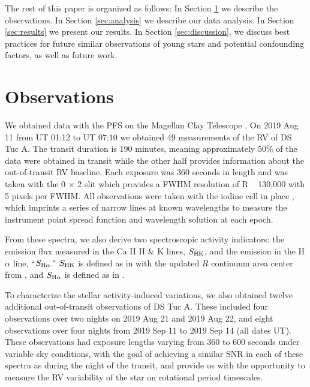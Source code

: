 \documentclass[twocolumn]{aastex63}
\begin{document}
The rest of this paper is organized as follows:
In Section \ref{sec:obs} we describe the observations.
In Section \ref{sec:analysis} we describe our data analysis.
In Section \ref{sec:results} we present our results.
In Section \ref{sec:discussion}, we discuss best practices for future similar observations of young stars and potential confounding factors, as well as future work.


\section{Observations}
\label{sec:obs}

We obtained data with the PFS on the Magellan Clay Telescope \citep{Crane06, Crane08, Crane10}. 
On 2019 Aug 11 from UT 01:12 to UT 07:10 we obtained 49 measurements of the RV of DS Tuc A. 
The transit duration is 190 minutes, meaning approximately 50\% of the data were obtained in transit while the other half provides information about the out-of-transit RV baseline. Each exposure was 360 seconds in length and was taken with the 0 $\times$ 2 slit which provides a FWHM resolution of R ~ 130,000 with 5 pixels per FWHM. All observations were taken with the iodine cell in place \citep{Marcy92}, which imprints a series of narrow lines at known wavelengths to measure the instrument point spread function and wavelength solution at each epoch.

From these spectra, we also derive two spectroscopic activity indicators: the emission flux measured in the Ca \textsc{II} H \& K lines, $S_{\rm HK}$, and the emission in the H$\alpha$ line, ``$S_{\rm H\alpha}$.'' $S_{\rm HK}$ is defined as in \cite{duncan1991} with the updated $R$ continuum area center from \cite{santos2000}, and $S_{\rm H\alpha}$ is defined as in \cite{gomesdasilva2011}.

To characterize the stellar activity-induced variations, we also obtained twelve additional out-of-transit observations of DS Tuc A. These included four observations over two nights on 2019 Aug 21 and 2019 Aug 22, and eight observations over four nights from 2019 Sep 11 to 2019 Sep 14 (all dates UT).
These observations had exposure lengths varying from 360 to 600 seconds under variable sky conditions, with the goal of achieving a similar SNR in each of these spectra as during the night of the transit, and provide us with the opportunity to measure the RV variability of the star on rotational period timescales.
\end{document}
